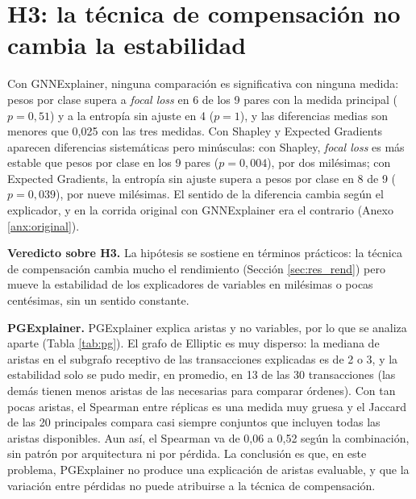 \section{H3: la técnica de compensación no cambia la estabilidad}\label{sec:res_h3}

\begin{table}[ht]
\centering
\caption{Estabilidad por técnica de compensación (3 arquitecturas que aprenden, media de los
escenarios principales). PC $>$ FL y PC $>$ SA: en cuántos de los 9 pares de arquitectura y
semilla pesos por clase supera a \textit{focal loss} o a sin ajuste, con el $p$ de la prueba
de signos.}
\label{tab:h3}
\scriptsize
\setlength{\tabcolsep}{3.5pt}

\end{table}

Con GNNExplainer, ninguna comparación es significativa con ninguna medida: pesos por clase
supera a \textit{focal loss} en 6 de los 9 pares con la medida principal ($p = 0{,}51$) y a
la entropía sin ajuste en 4 ($p = 1$), y las diferencias medias son menores que 0,025 con las
tres medidas. Con Shapley y Expected Gradients aparecen diferencias sistemáticas pero
minúsculas: con Shapley, \textit{focal loss} es más estable que pesos por clase en los 9 pares
($p = 0{,}004$), por dos milésimas; con Expected Gradients, la entropía sin ajuste supera a
pesos por clase en 8 de 9 ($p = 0{,}039$), por nueve milésimas. El sentido de la diferencia
cambia según el explicador, y en la corrida original con GNNExplainer era el contrario (Anexo
\ref{anx:original}).

\textbf{Veredicto sobre H3.} La hipótesis se sostiene en términos prácticos: la técnica de
compensación cambia mucho el rendimiento (Sección \ref{sec:res_rend}) pero mueve la estabilidad
de los explicadores de variables en milésimas o pocas centésimas, sin un sentido constante.

\begin{table}[ht]
\centering
\caption{Estabilidad de PGExplainer sobre las aristas del subgrafo: Spearman entre réplicas y
Jaccard de las 20 aristas principales (escenarios principales, media de 3 semillas).}
\label{tab:pg}
\small

\end{table}

\textbf{PGExplainer.} PGExplainer explica aristas y no variables, por lo que se analiza aparte
(Tabla \ref{tab:pg}). El grafo de Elliptic es muy disperso: la mediana de aristas en el
subgrafo receptivo de las transacciones explicadas es de 2 o 3, y la estabilidad solo se pudo
medir, en promedio, en 13 de las 30 transacciones (las demás tienen menos aristas de las
necesarias para comparar órdenes). Con tan pocas aristas, el Spearman entre réplicas es una
medida muy gruesa y el Jaccard de las 20 principales compara casi siempre conjuntos que
incluyen todas las aristas disponibles. Aun así, el Spearman va de 0,06 a 0,52 según la
combinación, sin patrón por arquitectura ni por pérdida. La conclusión es que, en este
problema, PGExplainer no produce una explicación de aristas evaluable, y que la variación entre
pérdidas no puede atribuirse a la técnica de compensación.

